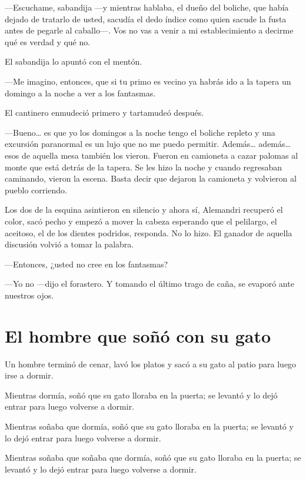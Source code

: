 \documentclass[11pt,twoside,openright]{book}
\begin{document}
—Escuchame, sabandija —y mientras hablaba, el dueño del boliche, que había dejado de tratarlo de usted, sacudía el dedo índice como quien sacude la fusta antes de pegarle al caballo—. Vos no vas a venir a mi establecimiento a decirme qué es verdad y qué no.

El sabandija lo apuntó con el mentón.

—Me imagino, entonces, que si tu primo es vecino ya habrás ido a la tapera un domingo a la noche a ver a los fantasmas.

El cantinero enmudeció primero y tartamudeó después.

—Bueno… es que yo los domingos a la noche tengo el boliche repleto y una excursión paranormal es un lujo que no me puedo permitir. Además… además… esos de aquella mesa también los vieron. Fueron en camioneta a cazar palomas al monte que está detrás de la tapera. Se les hizo la noche y cuando regresaban caminando, vieron la escena. Basta decir que dejaron la camioneta y volvieron al pueblo corriendo.

Los dos de la esquina asintieron en silencio y ahora sí, Alemandri recuperó el color, sacó pecho y empezó a mover la cabeza esperando que el pelilargo, el aceitoso, el de los dientes podridos, responda. No lo hizo. El ganador de aquella discusión volvió a tomar la palabra.

—Entonces, ¿usted no cree en los fantasmas?

—Yo no —dijo el forastero. Y tomando el último trago de caña, se evaporó ante nuestros ojos.





\chapter*{El hombre que soñó con su gato} 





Un hombre terminó de cenar, lavó los platos y sacó a su gato al patio para luego irse a dormir.

Mientras dormía, soñó que su gato lloraba en la puerta; se levantó y lo dejó entrar para luego volverse a dormir.

Mientras soñaba que dormía, soñó que su gato lloraba en la puerta; se levantó y lo dejó entrar para luego volverse a dormir.

Mientras soñaba que soñaba que dormía, soñó que su gato lloraba en la puerta; se levantó y lo dejó entrar para luego volverse a dormir.
\end{document}
